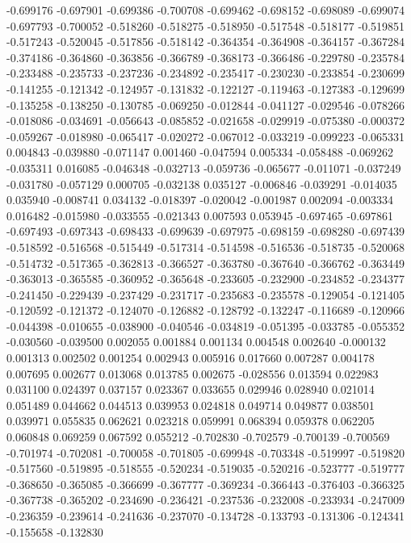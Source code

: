 -0.699176
-0.697901
-0.699386
-0.700708
-0.699462
-0.698152
-0.698089
-0.699074
-0.697793
-0.700052
-0.518260
-0.518275
-0.518950
-0.517548
-0.518177
-0.519851
-0.517243
-0.520045
-0.517856
-0.518142
-0.364354
-0.364908
-0.364157
-0.367284
-0.374186
-0.364860
-0.363856
-0.366789
-0.368173
-0.366486
-0.229780
-0.235784
-0.233488
-0.235733
-0.237236
-0.234892
-0.235417
-0.230230
-0.233854
-0.230699
-0.141255
-0.121342
-0.124957
-0.131832
-0.122127
-0.119463
-0.127383
-0.129699
-0.135258
-0.138250
-0.130785
-0.069250
-0.012844
-0.041127
-0.029546
-0.078266
-0.018086
-0.034691
-0.056643
-0.085852
-0.021658
-0.029919
-0.075380
-0.000372
-0.059267
-0.018980
-0.065417
-0.020272
-0.067012
-0.033219
-0.099223
-0.065331
0.004843
-0.039880
-0.071147
0.001460
-0.047594
0.005334
-0.058488
-0.069262
-0.035311
0.016085
-0.046348
-0.032713
-0.059736
-0.065677
-0.011071
-0.037249
-0.031780
-0.057129
0.000705
-0.032138
0.035127
-0.006846
-0.039291
-0.014035
0.035940
-0.008741
0.034132
-0.018397
-0.020042
-0.001987
0.002094
-0.003334
0.016482
-0.015980
-0.033555
-0.021343
0.007593
0.053945
-0.697465
-0.697861
-0.697493
-0.697343
-0.698433
-0.699639
-0.697975
-0.698159
-0.698280
-0.697439
-0.518592
-0.516568
-0.515449
-0.517314
-0.514598
-0.516536
-0.518735
-0.520068
-0.514732
-0.517365
-0.362813
-0.366527
-0.363780
-0.367640
-0.366762
-0.363449
-0.363013
-0.365585
-0.360952
-0.365648
-0.233605
-0.232900
-0.234852
-0.234377
-0.241450
-0.229439
-0.237429
-0.231717
-0.235683
-0.235578
-0.129054
-0.121405
-0.120592
-0.121372
-0.124070
-0.126882
-0.128792
-0.132247
-0.116689
-0.120966
-0.044398
-0.010655
-0.038900
-0.040546
-0.034819
-0.051395
-0.033785
-0.055352
-0.030560
-0.039500
0.002055
0.001884
0.001134
0.004548
0.002640
-0.000132
0.001313
0.002502
0.001254
0.002943
0.005916
0.017660
0.007287
0.004178
0.007695
0.002677
0.013068
0.013785
0.002675
-0.028556
0.013594
0.022983
0.031100
0.024397
0.037157
0.023367
0.033655
0.029946
0.028940
0.021014
0.051489
0.044662
0.044513
0.039953
0.024818
0.049714
0.049877
0.038501
0.039971
0.055835
0.062621
0.023218
0.059991
0.068394
0.059378
0.062205
0.060848
0.069259
0.067592
0.055212
-0.702830
-0.702579
-0.700139
-0.700569
-0.701974
-0.702081
-0.700058
-0.701805
-0.699948
-0.703348
-0.519997
-0.519820
-0.517560
-0.519895
-0.518555
-0.520234
-0.519035
-0.520216
-0.523777
-0.519777
-0.368650
-0.365085
-0.366699
-0.367777
-0.369234
-0.366443
-0.376403
-0.366325
-0.367738
-0.365202
-0.234690
-0.236421
-0.237536
-0.232008
-0.233934
-0.247009
-0.236359
-0.239614
-0.241636
-0.237070
-0.134728
-0.133793
-0.131306
-0.124341
-0.155658
-0.132830
